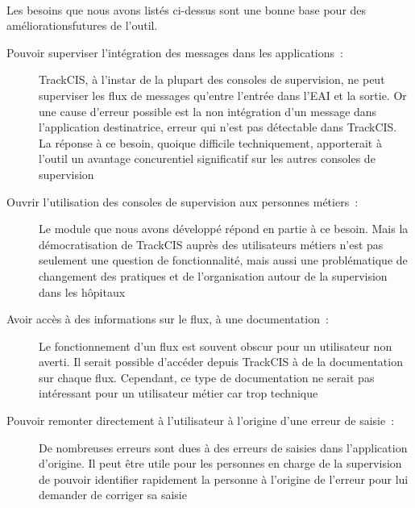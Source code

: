 			\paragraph{}%
			Les besoins que nous avons listés ci-dessus sont une bonne base pour des
			améliorationsfutures de l'outil.
			\begin{description}
				\item[Pouvoir superviser l'intégration des messages dans les applications~:]
				TrackCIS, à l'instar de la plupart des consoles de supervision, ne peut
				superviser les flux de messages qu'entre l'entrée dans l'EAI et la sortie.
				Or une cause d'erreur possible est la non intégration d'un message dans
				l'application destinatrice, erreur qui n'est pas détectable dans TrackCIS.
				La réponse à ce besoin, quoique difficile techniquement, apporterait à
				l'outil un avantage concurentiel significatif sur les autres consoles de
				supervision
				\item[Ouvrir l'utilisation des consoles de supervision aux personnes
				métiers~:] Le module que nous avons développé répond en partie à ce besoin.
				Mais la démocratisation de TrackCIS auprès des utilisateurs métiers n'est
				pas seulement une question de fonctionnalité, mais aussi une problématique de
				changement des pratiques et de l'organisation autour de la supervision dans
				les hôpitaux
				\item[Avoir accès à des informations sur le flux, à une documentation~:] Le
				fonctionnement d'un flux est souvent obscur pour un utilisateur non averti.
				Il serait possible d'accéder depuis TrackCIS à de la documentation sur
				chaque flux. Cependant, ce type de documentation ne serait pas intéressant
				pour un utilisateur métier car trop technique
				\item[Pouvoir remonter directement à l'utilisateur à l'origine d'une erreur
			  	de saisie~:] De nombreuses erreurs sont dues à des erreurs de saisies
			  	dans l'application d'origine. Il peut être utile pour les personnes en
			  	charge de la supervision de pouvoir identifier rapidement la personne à
			  	l'origine de l'erreur pour lui demander de corriger sa saisie
			\end{description}
			
